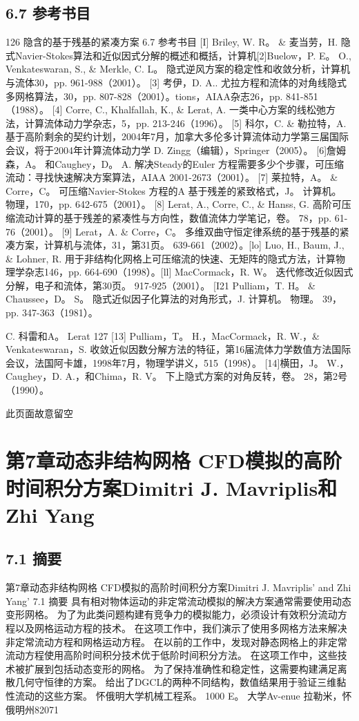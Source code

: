 \documentclass[UTF8,11pt,a4paper,openany,fontset=fandol]{ctexbook}
\begin{document}
\section{6.7 参考书目}
126 隐含的基于残基的紧凑方案 6.7 参考书目 [I] Briley, W. R。 \& 麦当劳，H. 隐式Navier-Stokes算法和近似因式分解的概述和概括，计算机[2]Buelow，P. E。 O., Venkateswaran, S., \& Merkle, C. L。 隐式逆风方案的稳定性和收敛分析，计算机与流体30，pp. 961-988（2001）。 [3] 考伊，D. A.. 尤拉方程和流体的对角线隐式多网格算法，30，pp. 807-828（2001）。tions，AIAA杂志26，pp. 841-851（1988）。 [4] Corre, C., Khalfallah, K., \& Lerat, A. 一类中心方案的线松弛方法，计算流体动力学杂志，5，pp. 213-246（1996）。 [5] 科尔，C. \& 勒拉特，A. 基于高阶剩余的契约计划，2004年7月，加拿大多伦多计算流体动力学第三届国际会议，将于2004年计算流体动力学 D. Zingg（编辑），Springer（2005）。 [6]詹姆森，A。 和Caughey，D。 A. 解决Steady的Euler 方程需要多少个步骤，可压缩流动：寻找快速解决方案算法，AIAA 2001-2673（2001）。 [7] 莱拉特，A。 \& Corre，C。 可压缩Navier-Stokes 方程的A 基于残差的紧致格式，J。 计算机。 物理，170，pp. 642-675（2001）。 [8] Lerat, A., Corre, C., \& Hanss, G. 高阶可压缩流动计算的基于残差的紧凑性与方向性，数值流体力学笔记，卷。 78，pp. 61-76（2001）。 [9] Lerat，A. \& Corre，C。 多维双曲守恒定律系统的基于残基的紧凑方案，计算机与流体，31，第31页。 639-661（2002）。[lo] Luo, H., Baum, J., \& Lohner, R. 用于非结构化网格上可压缩流的快速、无矩阵的隐式方法，计算物理学杂志146，pp. 664-690（1998）。[ll] MacCormack，R. W。 迭代修改近似因式分解，电子和流体，第30页。 917-925（2001）。 [I21 Pulliam，T. H。 \& Chaussee，D。 S。 隐式近似因子化算法的对角形式，J. 计算机。 物理。 39，pp. 347-363（1981）。

C. 科雷和A。 Lerat 127 [13] Pulliam，T。 H.，MacCormack，R. W.，\& Venkateswaran，S. 收敛近似因数分解方法的特征，第16届流体力学数值方法国际会议，法国阿卡雄，1998年7月，物理学讲义，515（1998）。 [14]横田，J。 W.，Caughey，D. A.，和Chima，R. V。 下上隐式方案的对角反转，卷。 28，第2号（1990）。

此页面故意留空

\clearpage
\chapter{第7章动态非结构网格 CFD模拟的高阶时间积分方案Dimitri J. Mavriplis和Zhi Yang}
\section{7.1 摘要}
第7章动态非结构网格 CFD模拟的高阶时间积分方案Dimitri J. Mavriplis' and Zhi Yang' 7.1 摘要 具有相对物体运动的非定常流动模拟的解决方案通常需要使用动态变形网格。 为了为此类问题构建有竞争力的模拟能力，必须设计有效积分流动方程以及网格运动方程的技术。 在这项工作中，我们演示了使用多网格方法来解决非定常流动方程和网格运动方程。 在以前的工作中，发现对静态网格上的非定常流动方程使用高阶时间积分技术优于低阶时间积分方法。 在这项工作中，这些技术被扩展到包括动态变形的网格。 为了保持准确性和稳定性，这需要构建满足离散几何守恒律的方案。 给出了DGCL的两种不同结构，数值结果用于验证三维黏性流动的这些方案。 怀俄明大学机械工程系。 1000 E。 大学Av-enue 拉勒米，怀俄明州82071
\end{document}
